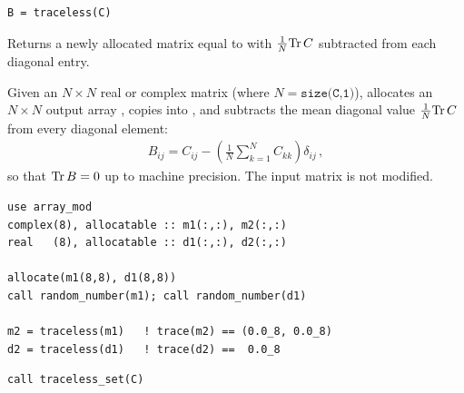 \lstset{language=[95]Fortran}
\begin{lstlisting}
B = traceless(C)
\end{lstlisting}

Returns a newly allocated matrix equal to  with $\frac{1}{N}{\rm Tr\,} C$ subtracted from each diagonal entry.

Given an $N\times N$ real or complex matrix  (where $N = \texttt{size(C,1)}$),  allocates an $N\times N$ output array , copies  into , and subtracts the mean diagonal value $\frac{1}{N}{\rm Tr\,} C$ from every diagonal element:
\begin{align}
  B_{ij} = C_{ij} - \left(\frac{1}{N}\sum_{k=1}^{N} C_{kk}\right) \delta_{ij}\, ,
\end{align}
so that ${\rm Tr\,} B = 0$ up to machine precision. The input matrix  is not modified.

\begin{description}[leftmargin=2.2cm, style=nextline]
\end{description}

\lstset{language=[95]Fortran}
\begin{lstlisting}
use array_mod
complex(8), allocatable :: m1(:,:), m2(:,:)
real   (8), allocatable :: d1(:,:), d2(:,:)

allocate(m1(8,8), d1(8,8))
call random_number(m1); call random_number(d1)

m2 = traceless(m1)   ! trace(m2) == (0.0_8, 0.0_8)
d2 = traceless(d1)   ! trace(d2) ==  0.0_8
\end{lstlisting}


\lstset{language=[95]Fortran}
\begin{lstlisting}
call traceless_set(C)
\end{lstlisting}

